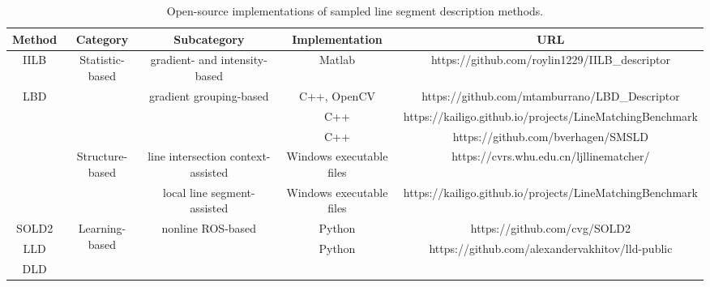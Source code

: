 \documentclass[journal,compsoc]{IEEEtran}
\begin{document}
\begin{table*}[tbp] 	
	\centering 	
	\scriptsize 	
	\caption{Open-source implementations of sampled line segment description methods.} 	\begin{tabular}{|c|c|c|c|c|} 		
		\hline 		Method                                                                                                & Category                         & Subcategory                              & Implementation           & URL                                                      \\ \hline 		IILB \cite{IILB}                                                                                      & \multirow{4}{*}{Statistic-based} & gradient- and intensity-based            & Matlab                   & https://github.com/roylin1229/IILB\_descriptor           \\ \cline{1-1} \cline{3-5}  		LBD \cite{LBD}                                                                                        &                                  & \multirow{3}{*}{gradient grouping-based} & C++, OpenCV              & https://github.com/mtamburrano/LBD\_Descriptor           \\ \cline{1-1} \cline{4-5}  		\cite{MSLD}                                                                                           &                                  &                                          & C++                      & https://kailigo.github.io/projects/LineMatchingBenchmark \\ \cline{1-1} \cline{4-5}  		\cite{Scaleinvariantlinedescriptorsforwidebaselinematching}                                           &                                  &                                          & C++                      & https://github.com/bverhagen/SMSLD                       \\ \hline 		\cite{HierarchicalLineMatchingBasedonLineJunctionLineStructureDescriptorandLocalHomographyEstimation} & \multirow{2}{*}{Structure-based} & line intersection context-assisted       & Windows executable files & https://cvrs.whu.edu.cn/ljllinematcher/                  \\ \cline{1-1} \cline{3-5}  		\cite{WidebaselineimagematchingusingLineSignatures}                                                   &                                  & local line segment-assisted              & Windows executable files & https://kailigo.github.io/projects/LineMatchingBenchmark \\ \hline 		SOLD2 \cite{SOLD2}                                                                                    & \multirow{4}{*}{Learning-based}  & \multirow{2}{*}{nonline ROS-based}       & Python                   & https://github.com/cvg/SOLD2                             \\ \cline{1-1} \cline{4-5}  		LLD \cite{LearnableLineSegmentDescriptorforVisualSLAM}                                                &                                  &                                          & Python                   & https://github.com/alexandervakhitov/lld-public          \\ \cline{1-1} \cline{3-5}  		DLD  \cite{DLD}                                            
\end{tabular}
\end{table*}
\end{document}
